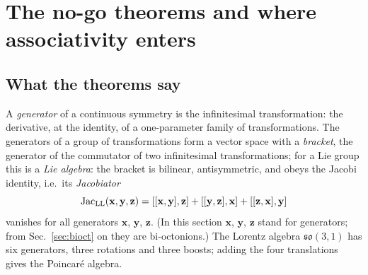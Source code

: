 \section{The no-go theorems and where associativity enters}
\label{sec:nogo}

\subsection{What the theorems say}

A \emph{generator} of a continuous symmetry is the infinitesimal transformation: the derivative, at
the identity, of a one-parameter family of transformations. The generators of a group of
transformations form a vector space with a \emph{bracket}, the generator of the commutator of two
infinitesimal transformations; for a Lie group this is a \emph{Lie algebra}: the bracket is bilinear,
antisymmetric, and obeys the Jacobi identity, i.e.\ its \emph{Jacobiator}
\begin{equation}
\mathrm{Jac}_{\rm LL}(\mathbf x,\mathbf y,\mathbf z)=[[\mathbf x,\mathbf y],\mathbf z]+[[\mathbf y,\mathbf z],\mathbf x]+[[\mathbf z,\mathbf x],\mathbf y]
\label{eq:jacobiator}
\end{equation}
vanishes for all generators $\mathbf x$, $\mathbf y$, $\mathbf z$. (In this section $\mathbf x$,
$\mathbf y$, $\mathbf z$ stand for generators; from Sec.~\ref{sec:bioct} on they are bi-octonions.)
The Lorentz algebra $\mathfrak{so}(3,1)$ has six generators, three rotations and three boosts; adding
the four translations gives the Poincar\'e algebra.


